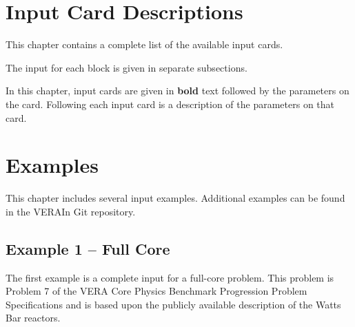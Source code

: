 \documentclass{vera-ornltm}
\begin{document}













\section{Input Card Descriptions} \label{chap:cards}
This chapter contains a complete list of the available input cards.

The input for each block is given in separate subsections.

In this chapter, input cards are given in {\bf bold} text followed by the parameters on the card.
Following each input card is a description of the parameters on that card.



\clearpage
\section{Examples}
\label{chap:example}

This chapter includes several input examples.  Additional examples can be found in the VERAIn Git repository.

\subsection{Example 1 -- Full Core}
The first example is a complete input for a full-core problem.
This problem is Problem 7 of the VERA Core Physics Benchmark Progression Problem Specifications and
is based upon the publicly available description of the Watts Bar reactors.
\end{document}
